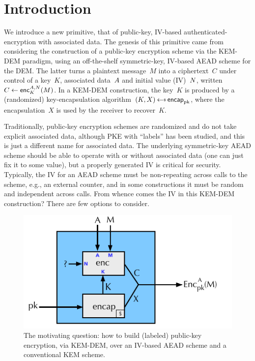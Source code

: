 \section{Introduction}
\label{sec:intro}
We introduce a new primitive, that of public-key, IV-based authenticated-encryption with associated data. The genesis of this primitive came from considering the construction of a public-key encryption scheme via the KEM-DEM paradigm, using an off-the-shelf symmetric-key, IV-based AEAD scheme for the DEM.  The latter turns a plaintext message~$M$ into a ciphertext~$C$ under control of a key~$K$, associated data~$A$ and initial value (IV)~$N$, written $C \gets {\mathsf{enc}}_{K}^{A,N}(M)$.  In a KEM-DEM construction, the key~$K$ is produced by a (randomized) key-encapsulation algorithm~$(K,X)\getsr\encap_\pk$, where the encapsulation~$X$ is used by the receiver to recover~$K$.  

Traditionally, public-key encryption schemes are randomized and do not take explicit associated data, although PKE with ``labels'' has been studied, and this is just a different name for associated data. The underlying symmetric-key AEAD scheme should be able to operate with or without associated data (one can just fix it to some value), but a properly generated IV is critical for security.  Typically, the IV for an AEAD scheme must be non-repeating across calls to the scheme, e.g., an external counter, and in some constructions it must be random and independent across calls. From whence comes the IV in this KEM-DEM construction?  There are few options to consider.  

\begin{figure}[h]
\begin{center}
\includegraphics[scale=1.2]{kem-dem.pdf}
\caption{The motivating question: how to build (labeled) public-key encryption, via KEM-DEM, over an IV-based AEAD scheme and a conventional KEM scheme.}
\label{fig:kem-example}
\end{center}
\end{figure}

